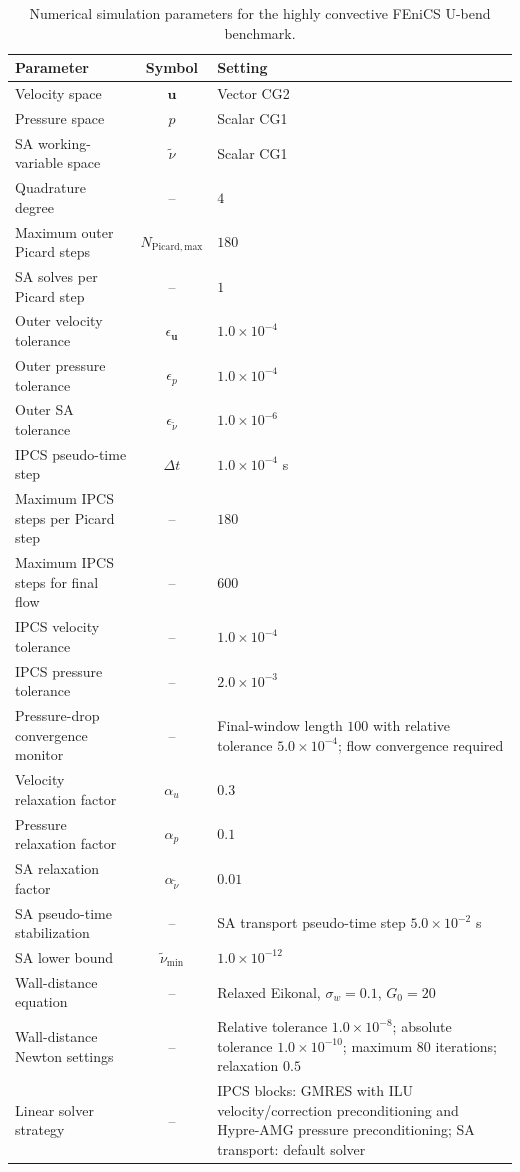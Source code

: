 \begin{table}[htbp]
	\centering
	\footnotesize
	\caption{Numerical simulation parameters for the highly convective FEniCS U-bend benchmark.}
	\label{tab:app_A_ubend_numerical}
	\renewcommand{\arraystretch}{1.2}
	\begin{tabularx}{\textwidth}{l c X}
		\hline
		\textbf{Parameter} & \textbf{Symbol} & \textbf{Setting} \\
		\hline
		Velocity space & $\mathbf{u}$ & Vector CG2 \\
		Pressure space & $p$ & Scalar CG1 \\
		SA working-variable space & $\tilde{\nu}$ & Scalar CG1 \\
		Quadrature degree & -- & $4$ \\
		Maximum outer Picard steps & $N_{\mathrm{Picard,max}}$ & $180$ \\
		SA solves per Picard step & -- & $1$ \\
		Outer velocity tolerance & $\epsilon_{\mathbf{u}}$ & $1.0 \times 10^{-4}$ \\
		Outer pressure tolerance & $\epsilon_p$ & $1.0 \times 10^{-4}$ \\
		Outer SA tolerance & $\epsilon_{\tilde{\nu}}$ & $1.0 \times 10^{-6}$ \\
			IPCS pseudo-time step & $\Delta t$ & $1.0 \times 10^{-4}$ s \\
			Maximum IPCS steps per Picard step & -- & $180$ \\
			Maximum IPCS steps for final flow & -- & $600$ \\
			IPCS velocity tolerance & -- & $1.0 \times 10^{-4}$ \\
			IPCS pressure tolerance & -- & $2.0 \times 10^{-3}$ \\
			Pressure-drop convergence monitor & -- & Final-window length $100$ with relative tolerance $5.0\times10^{-4}$; flow convergence required \\
			Velocity relaxation factor & $\alpha_u$ & $0.3$ \\
			Pressure relaxation factor & $\alpha_p$ & $0.1$ \\
			SA relaxation factor & $\alpha_{\tilde{\nu}}$ & $0.01$ \\
			SA pseudo-time stabilization & -- & SA transport pseudo-time step $5.0\times10^{-2}$ s \\
			SA lower bound & $\tilde{\nu}_{\min}$ & $1.0 \times 10^{-12}$ \\
		Wall-distance equation & -- & Relaxed Eikonal, $\sigma_w=0.1$, $G_0=20$ \\
		Wall-distance Newton settings & -- & Relative tolerance $1.0 \times 10^{-8}$; absolute tolerance $1.0 \times 10^{-10}$; maximum $80$ iterations; relaxation $0.5$ \\
		Linear solver strategy & -- & IPCS blocks: GMRES with ILU velocity/correction preconditioning and Hypre-AMG pressure preconditioning; SA transport: default solver \\
		\hline
	\end{tabularx}
\end{table}

